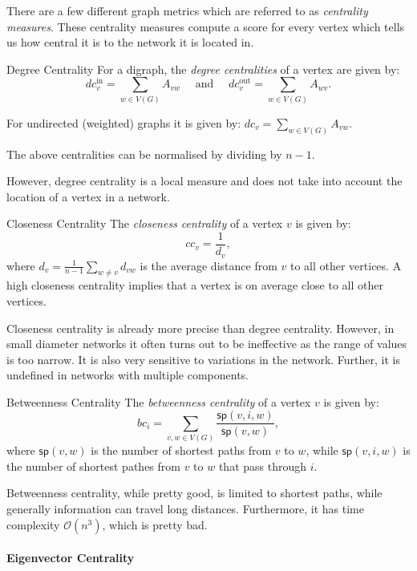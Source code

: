 \documentclass[english]{panikzettel}
\begin{document}
There are a few different graph metrics which are referred to as \textit{centrality measures}.
These centrality measures compute a score for every vertex which tells us how central it is to the network it is located in.

\begin{defi}{Degree Centrality}
    For a digraph, the \textit{degree centralities} of a vertex are given by:
    \[
        dc_v^{\text{in}} = \sum_{w\in V(G)} A_{vw} \quad\text{ and }\quad dc_v^{\text{out}} = \sum_{w\in V(G)} A_{wv}.
    \]

    For undirected (weighted) graphs it is given by: $dc_v = \sum_{w\in V(G)} A_{vw}$.

    The above centralities can be normalised by dividing by $n-1$.
\end{defi}

However, degree centrality is a local measure and does not take into account the location of a vertex in a network.

\begin{defi}{Closeness Centrality}
    The \textit{closeness centrality} of a vertex $v$ is given by: $$cc_v = \frac{1}{d_v},$$ where $d_v = \frac{1}{n-1} \sum_{w \neq v} d_{vw}$ is the average distance from $v$ to all other vertices.
    A high closeness centrality implies that a vertex is on average close to all other vertices.
\end{defi}

Closeness centrality is already more precise than degree centrality.
However, in small diameter networks it often turns out to be ineffective as the range of values is too narrow.
It is also very sensitive to variations in the network.
Further, it is undefined in networks with multiple components.

\begin{defi}{Betweenness Centrality}
    The \textit{betweenness centrality} of a vertex $v$ is given by: $$bc_i = \sum_{v,w\in V(G)} \frac{\textsf{sp}(v,i,w)}{\textsf{sp}(v,w)},$$ where $\textsf{sp}(v,w)$ is the number of shortest paths from $v$ to $w$, while $\textsf{sp}(v,i,w)$ is the number of shortest pathes from $v$ to $w$ that pass through $i$.
\end{defi}

Betweenness centrality, while pretty good, is limited to shortest paths, while generally information can travel long distances.
Furthermore, it has time complexity $\mathcal{O}(n^3)$, which is pretty bad.

\paragraph{Eigenvector Centrality}
\end{document}
